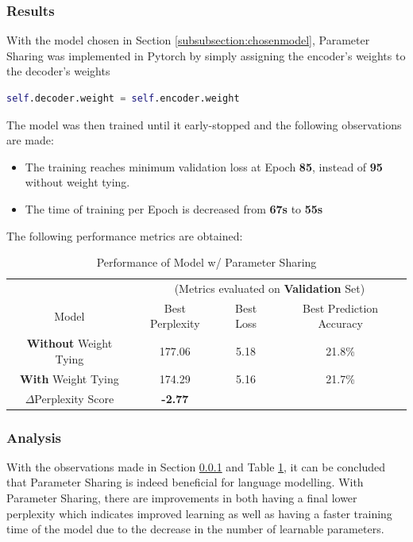 \documentclass[sigconf,nonacm=true]{acmart}
\begin{document}
\subsubsection{Results}
\label{subsubsection:weighttieresults}
With the model chosen in Section \ref{subsubsection:chosenmodel}, Parameter Sharing was implemented in Pytorch by simply assigning the encoder's weights to the decoder's weights
\begin{lstlisting}[language=Python]
self.decoder.weight = self.encoder.weight
\end{lstlisting}
The model was then trained until it early-stopped and the following observations are made:
\begin{itemize}
	\item The training reaches minimum validation loss at Epoch \textbf{85}, instead of \textbf{95} without weight tying.
	\item The time of training per Epoch is decreased from \textbf{67s} to \textbf{55s}
\end{itemize}
The following performance metrics are obtained:

\begin{table}[h]
	\begin{adjustbox}{width=\columnwidth}
		\begin{tabular}{cccc}
			\toprule
			&\multicolumn{3}{c}{(Metrics evaluated on \textbf{Validation} Set)}\\
			Model &Best Perplexity&Best Loss&Best Prediction Accuracy\\
			\midrule
			\textbf{Without} Weight Tying & 177.06 & 5.18 & 21.8\% \\
			\textbf{With} Weight Tying & 174.29 & 5.16 & 21.7\% \\
			\midrule
			$\Delta$Perplexity Score & \textbf{-2.77}\\
			\bottomrule
		\end{tabular}
	\end{adjustbox}
	\caption{Performance of Model w/ Parameter Sharing}
	\label{tab:weighttiecomp}
\end{table}

\subsubsection{Analysis}
With the observations made in Section \ref{subsubsection:weighttieresults} and Table \ref{tab:weighttiecomp}, it can be concluded that Parameter Sharing is indeed beneficial for language modelling. With Parameter Sharing, there are improvements in both having a final lower perplexity which indicates improved learning as well as having a faster training time of the model due to the decrease in the number of learnable parameters.
\end{document}
